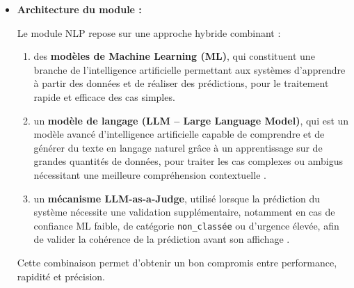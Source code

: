 \documentclass[12pt,a4paper,oneside]{report}
\begin{document}
\begin{itemize}
    \item \textbf{Architecture du module :}

\vspace{0.3cm}
Le module NLP repose sur une approche hybride combinant :

\begin{enumerate}
    \item des \textbf{modèles de Machine Learning (ML)}, qui constituent une branche de l’intelligence artificielle permettant aux systèmes d’apprendre à partir des données et de réaliser des prédictions, pour le traitement rapide et efficace des cas simples.
    \item un \textbf{modèle de langage (LLM – Large Language Model)}, qui est un modèle avancé d’intelligence artificielle capable de comprendre et de générer du texte en langage naturel grâce à un apprentissage sur de grandes quantités de données, pour traiter les cas complexes ou ambigus nécessitant une meilleure compréhension contextuelle \cite{ibmllm,hftransformers}.
    \item un \textbf{mécanisme LLM-as-a-Judge}, utilisé lorsque la prédiction du système nécessite une validation supplémentaire, notamment en cas de confiance ML faible, de catégorie \texttt{non\_classée} ou d’urgence élevée, afin de valider la cohérence de la prédiction avant son affichage \cite{ibmeval}.

\end{enumerate}

Cette combinaison permet d’obtenir un bon compromis entre performance, rapidité et précision.
\end{itemize}

\vspace{0.3cm}
\end{document}
